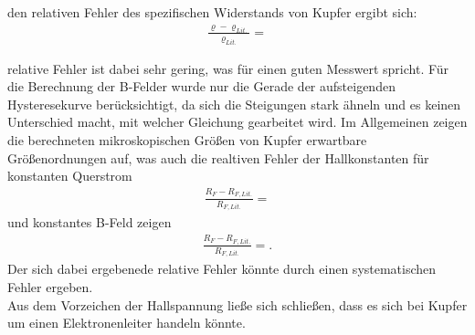 \justifying den relativen Fehler des spezifischen Widerstands von Kupfer ergibt sich:
\begin{align}
    \frac{\varrho - \varrho_{Lit.}}{\varrho_{Lit.}} = \text{}
\end{align}

\justifying relative Fehler ist dabei sehr gering, was für einen guten Messwert spricht.
Für die Berechnung der B-Felder wurde nur die Gerade der aufsteigenden Hysteresekurve
berücksichtigt, da sich die Steigungen stark ähneln und es keinen Unterschied macht,
mit welcher Gleichung gearbeitet wird.
Im Allgemeinen zeigen die berechneten mikroskopischen Größen von Kupfer erwartbare
Größenordnungen auf, was auch die realtiven Fehler der Hallkonstanten für konstanten
Querstrom
\begin{align}
    \frac{R_F - R_{F,Lit.}}{R_{F,Lit.}} = \text{}
\end{align}
und konstantes B-Feld zeigen
\begin{align}
    \frac{R_F - R_{F,Lit.}}{R_{F,Lit.}} = \text{}.
\end{align}
 Der sich dabei ergebenede relative Fehler könnte durch einen systematischen
 Fehler ergeben.\\
 Aus dem Vorzeichen der Hallspannung ließe sich schließen, dass es sich bei Kupfer
 um einen Elektronenleiter handeln könnte.


